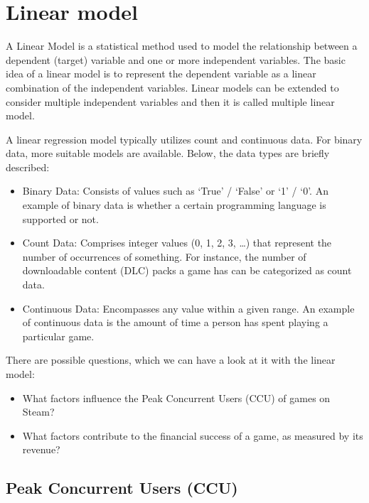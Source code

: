 \documentclass[
]{article}
\providecommand{\tightlist}{%
  \setlength{\itemsep}{0pt}\setlength{\parskip}{0pt}}
\begin{document}
\hypertarget{linear-model}{%
\section{Linear model}\label{linear-model}}

A Linear Model is a statistical method used to model the relationship
between a dependent (target) variable and one or more independent
variables. The basic idea of a linear model is to represent the
dependent variable as a linear combination of the independent variables.
Linear models can be extended to consider multiple independent variables
and then it is called multiple linear model.

A linear regression model typically utilizes count and continuous data.
For binary data, more suitable models are available. Below, the data
types are briefly described:

\begin{itemize}
\tightlist
\item
  Binary Data: Consists of values such as `True' / `False' or `1' / `0'.
  An example of binary data is whether a certain programming language is
  supported or not.
\item
  Count Data: Comprises integer values (0, 1, 2, 3, \ldots) that
  represent the number of occurrences of something. For instance, the
  number of downloadable content (DLC) packs a game has can be
  categorized as count data.
\item
  Continuous Data: Encompasses any value within a given range. An
  example of continuous data is the amount of time a person has spent
  playing a particular game.
\end{itemize}

There are possible questions, which we can have a look at it with the
linear model:

\begin{itemize}
\tightlist
\item
  What factors influence the Peak Concurrent Users (CCU) of games on
  Steam?
\item
  What factors contribute to the financial success of a game, as
  measured by its revenue?
\end{itemize}

\hypertarget{peak-concurrent-users-ccu}{%
\subsection{Peak Concurrent Users
(CCU)}\label{peak-concurrent-users-ccu}}
\end{document}

